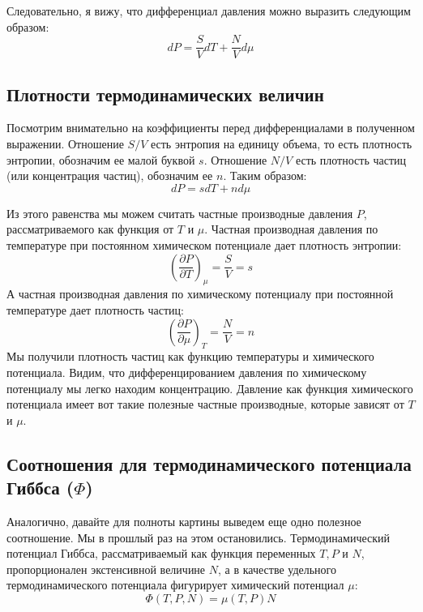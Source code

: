 \documentclass[../general/general]{subfiles}
\begin{document}
Следовательно, я вижу, что дифференциал давления можно выразить следующим образом:
\begin{equation}
    dP = \frac{S}{V} dT + \frac{N}{V} d\mu
\end{equation}

\subsection{Плотности термодинамических величин}

Посмотрим внимательно на коэффициенты перед дифференциалами в полученном выражении. Отношение $S/V$ есть энтропия на единицу объема, то есть плотность энтропии, обозначим ее малой буквой $s$. Отношение $N/V$ есть плотность частиц (или концентрация частиц), обозначим ее $n$. Таким образом:
\begin{equation}
    dP = s dT + n d\mu
\end{equation}

Из этого равенства мы можем считать частные производные давления $P$, рассматриваемого как функция от $T$ и $\mu$. Частная производная давления по температуре при постоянном химическом потенциале дает плотность энтропии:
\begin{equation}
    \left( \frac{\partial P}{\partial T} \right)_{\mu} = \frac{S}{V} = s
\end{equation}
А частная производная давления по химическому потенциалу при постоянной температуре дает плотность частиц:
\begin{equation}
    \left( \frac{\partial P}{\partial \mu} \right)_{T} = \frac{N}{V} = n
\end{equation}
Мы получили плотность частиц как функцию температуры и химического потенциала. Видим, что дифференцированием давления по химическому потенциалу мы легко находим концентрацию. Давление как функция химического потенциала имеет вот такие полезные частные производные, которые зависят от $T$ и $\mu$. 

\subsection{Соотношения для термодинамического потенциала Гиббса ($\Phi$)}

Аналогично, давайте для полноты картины выведем еще одно полезное соотношение. Мы в прошлый раз на этом остановились. Термодинамический потенциал Гиббса, рассматриваемый как функция переменных $T, P$ и $N$, пропорционален экстенсивной величине $N$, а в качестве удельного термодинамического потенциала фигурирует химический потенциал $\mu$:
\begin{equation}
    \Phi(T, P, N) = \mu(T, P) N
\end{equation}
\end{document}
